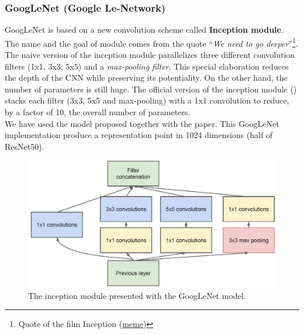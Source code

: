 \subsubsection*{GoogLeNet (Google Le-Network)}
GoogLeNet\cite{googLeNet_paper} is based on a new convolution scheme called \textbf{Inception module}. The name and the goal of module comes from the quote “\textit{We need to go deeper}”\footnote{Quote of the film Inception (\href{https://i.kym-cdn.com/photos/images/newsfeed/000/531/557/a88.jpg}{meme})}.\\
The naive version of the inception module parallelizes three different convolution filters (1x1, 3x3, 5x5) and a \textit{max-pooling filter}. This special elaboration reduces the depth of the CNN while preserving its potentiality. On the other hand, the number of parameters is still huge. The official version of the inception module () stacks each filter (3x3, 5x5 and max-pooling) with a 1x1 convolution to reduce, by a factor of 10, the overall number of parameters.\\
We have used the model\cite{googleNet_model} proposed together with the paper. This GoogLeNet implementation produce a representation point in 1024 dimensions (half of ResNet50).
\begin{figure}[!h]
	\centering
	\includegraphics[width=0.8\linewidth]{images/recognition/howItWorks_inceptionModule}
	\captionsetup{margin=0.5cm}
	\caption{The inception module presented with the GoogLeNet model.}
	\label{fig:howItWorks_inceptionModule}
\end{figure}


